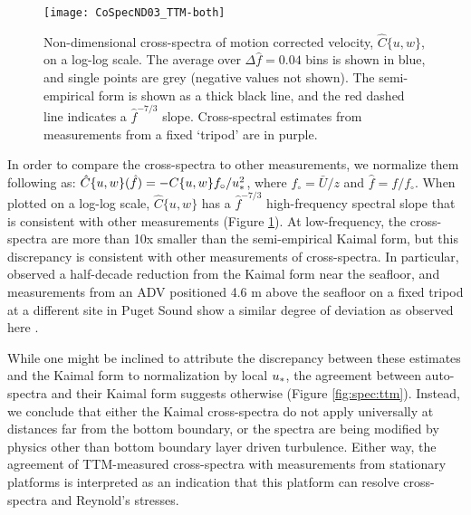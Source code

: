 \begin{figure}[t]
  \centering
  \texttt{[image: CoSpecND03\_TTM-both]}
  \caption{Non-dimensional cross-spectra of motion corrected velocity, $\hat{C}\{u,w\}$, on a log-log scale. The average over $\Delta \hat{f} = 0.04$ bins is shown in blue, and single points are grey (negative values not shown). The semi-empirical \cite{Kaimal++1972} form is shown as a thick black line, and the red dashed line indicates a $\hat{f}^{-7/3}$ slope. Cross-spectral estimates from measurements from a fixed `tripod' are in purple.}
  \label{fig:cspecnd:ttm}
\end{figure}

In order to compare the cross-spectra to other measurements, we normalize them following \cite{Kaimal++1972} as: $\hat{C}\{u,w\}(\hat{f}) = -C\{u,w\} f_\circ / u_*^2$, where $f_\circ = \bar{U} / z$ and $\hat{f} = f / f_\circ$. 
When plotted on a log-log scale, $\hat{C}\lbrace u,w \rbrace$ has a $\hat{f}^{-7/3}$ high-frequency spectral slope that is consistent with other measurements (Figure \ref{fig:cspecnd:ttm}). At low-frequency, the cross-spectra are more than 10x smaller than the semi-empirical Kaimal form, but this discrepancy is consistent with other measurements of cross-spectra. In particular, \cite{Walter++2011} observed a half-decade reduction from the Kaimal form near the seafloor, and measurements from an ADV positioned 4.6 m above the seafloor on a fixed tripod at a different site in Puget Sound show a similar degree of deviation as observed here \cite[]{Thomson++2012}. 

While one might be inclined to attribute the discrepancy between these estimates and the Kaimal form to normalization by local $u_*$, the agreement between auto-spectra and their Kaimal form suggests otherwise (Figure \ref{fig:spec:ttm}). Instead, we conclude that either the Kaimal cross-spectra do not apply universally at distances far from the bottom boundary, or the spectra are being modified by physics other than bottom boundary layer driven turbulence. Either way, the agreement of TTM-measured cross-spectra with measurements from stationary platforms is interpreted as an indication that this platform can resolve cross-spectra and Reynold's stresses.

